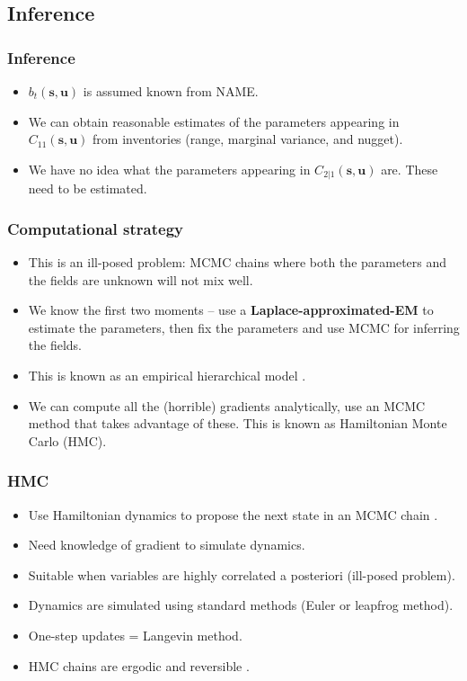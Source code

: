 \documentclass{beamer}
\newcommand{\svec} {\textbf{s}}
\newcommand{\uvec} {\textbf{u}}
\begin{document}
\subsection{Inference}

\begin{frame}
\frametitle{Inference}

\begin{itemize}
\item $b_t(\svec,\uvec)$ is assumed known from NAME. \vfill
\item We can obtain reasonable estimates of the parameters appearing in $C_{11}(\svec,\uvec)$ from inventories (range, marginal variance, and nugget). \vfill
\item We have no idea what the parameters appearing in $C_{2|1}(\svec,\uvec)$ are. These need to be estimated. \vfill
\end{itemize}
\end{frame}

\begin{frame}
\frametitle{Computational strategy}

\begin{itemize}
\item This is an ill-posed problem: MCMC chains where both the parameters and the fields are unknown will not mix well. \pause \vfill 
\item We know the first two moments -- use a {\bf Laplace-approximated-EM} to estimate the parameters, then fix the parameters and use MCMC for inferring the fields. \vfill \pause
\item This is known as an empirical hierarchical model \citep[EHM;][]{CressieWikle2011}. \vfill \pause
\item We can compute all the (horrible) gradients analytically, use an MCMC method that takes advantage of these. This is known as Hamiltonian Monte Carlo (HMC). \vfill
\end{itemize}
\end{frame}

\begin{frame}
\frametitle{HMC}

\begin{itemize}
\item Use Hamiltonian dynamics to propose the next state in an MCMC chain \citep{Duane_1987}.
\item Need knowledge of gradient to simulate dynamics.
\item Suitable when variables are highly correlated a posteriori (ill-posed problem).
\item Dynamics are simulated using standard methods (Euler or leapfrog method).
\item One-step updates = Langevin method.
\item HMC chains are ergodic and reversible \citep{Neal_2011}.
\end{itemize}
\end{frame}
\end{document}
